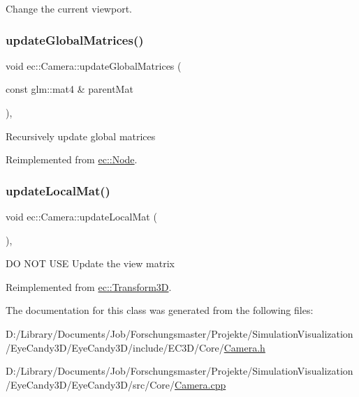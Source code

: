 Change the current viewport. \mbox{\label{classec_1_1_camera_a1661dae4666cf50e697603904c96df6a}} 
\subsubsection{\texorpdfstring{update\+Global\+Matrices()}{updateGlobalMatrices()}}
{\footnotesize\ttfamily void ec\+::\+Camera\+::update\+Global\+Matrices (\begin{DoxyParamCaption}\item[{const glm\+::mat4 \&}]{parent\+Mat }\end{DoxyParamCaption})\hspace{0.3cm}{\ttfamily [override]}, {\ttfamily [virtual]}}

Recursively update global matrices 

Reimplemented from \mbox{\hyperlink{classec_1_1_node_a12a9b14ccc434c52404e262ef5db6f80}{ec\+::\+Node}}.

\mbox{\label{classec_1_1_camera_acff95ac4ca039715d67c83111d03b8c1}} 
\subsubsection{\texorpdfstring{update\+Local\+Mat()}{updateLocalMat()}}
{\footnotesize\ttfamily void ec\+::\+Camera\+::update\+Local\+Mat (\begin{DoxyParamCaption}{ }\end{DoxyParamCaption})\hspace{0.3cm}{\ttfamily [override]}, {\ttfamily [virtual]}}

DO N\+OT U\+SE Update the view matrix 

Reimplemented from \mbox{\hyperlink{classec_1_1_transform3_d_a68d259da063ea2aff48720ae55870445}{ec\+::\+Transform3D}}.



The documentation for this class was generated from the following files\+:\begin{DoxyCompactItemize}
\item 
D\+:/\+Library/\+Documents/\+Job/\+Forschungsmaster/\+Projekte/\+Simulation\+Visualization/\+Eye\+Candy3\+D/\+Eye\+Candy3\+D/include/\+E\+C3\+D/\+Core/\mbox{\hyperlink{_camera_8h}{Camera.\+h}}\item 
D\+:/\+Library/\+Documents/\+Job/\+Forschungsmaster/\+Projekte/\+Simulation\+Visualization/\+Eye\+Candy3\+D/\+Eye\+Candy3\+D/src/\+Core/\mbox{\hyperlink{_camera_8cpp}{Camera.\+cpp}}\end{DoxyCompactItemize}
